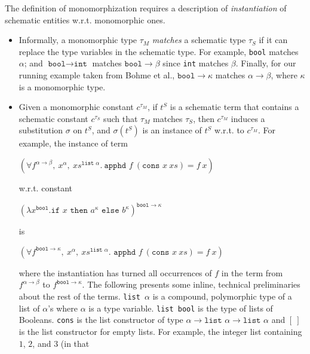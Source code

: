 \documentclass{article}
\begin{document}
	The definition of monomorphization 
	requires a description of 
	\textit{instantiation} of schematic 
	entities w.r.t. 
	monomorphic ones.
	\begin{itemize}
		\item Informally, a monomorphic type 
		$\tau_M$ \textit{matches} a schematic 
		type $\tau_S$ if it can replace the 
		type variables in the schematic 
		type. For example, \texttt{bool} 
		matches $\alpha$; and $\texttt{bool} 
		\to \texttt{int}$ matches 
		$\texttt{bool} \to \beta$
		since \texttt{int} matches 
		$\beta$. Finally, for our running 
		example taken from Bohme et al., 
		${\texttt{bool} \to \kappa}$
		matches $\alpha \to \beta$,
		where $\kappa$ is a monomorphic
		type. 
		
		\item Given a monomorphic constant 
		$c^{\tau_M}$,  if $t^S$ is a 
		schematic term that contains a 
		schematic constant $c^{\tau_S}$ 
		such that $\tau_M$ matches 
		$\tau_S$, then $c^{\tau_M}$ induces 
		a substitution $\sigma$ on $t^S$, 
		and $\sigma(t^S)$ is an instance of 
		$t^S$ w.r.t. to $c^{\tau_M}$. 
		For example, the instance of term
		\begin{center}
			$(\forall f^{\alpha \to \beta},\ 
			x^{\alpha},\ xs^{\texttt{list }
				\alpha}.\ \texttt{apphd }f\ 
			(\texttt{cons }x\ xs) = f\ x)$
		\end{center} 
		w.r.t. constant
		\begin{center}
			$(\lambda x^{\texttt{bool}}.
			\texttt{if }x\texttt{ then }
			a^{\kappa} \texttt{ else }
			b^{\kappa})^{\texttt{bool} \to 
				\kappa}$ 
		\end{center}
		is
		\begin{center}
			$(\forall f^{\texttt{bool} 
				\to \kappa},\ x^{\alpha},\ 
			xs^{\texttt{list }\alpha}. 
			\texttt{ apphd }f\ (\texttt{cons }
			x \ xs) = f\ x)$
		\end{center}
		where the instantiation 
		has turned all occurrences of $f$ 
		in the term from $f^{\alpha \to \beta}$ 
		to $f^{\texttt{bool} \to \kappa}$.
		The following presents some inline, 
		technical preliminaries about 
		the rest of the terms.
		\texttt{list $\alpha$} is a compound,
		polymorphic type of a list of 
		$\alpha$'s where $\alpha$ is a type 
		variable. \texttt{list bool} is the 
		type of lists of Booleans. \texttt{cons} 
		is the list constructor of type 
		$\alpha \to \texttt{list }\alpha \to 
		\texttt{list }\alpha$ and $[\ ]$ is 
		the list constructor for empty lists. 
		For example, the integer list 
		containing $1$, $2$, and $3$ (in that 

\end{itemize}
\end{document}
